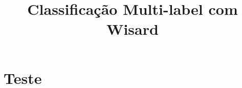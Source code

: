 \documentclass[a4paper,12pt]{article}
\begin{document}
\title{Classificação Multi-label com Wisard}
\maketitle

\section{Teste}
\end{document}
